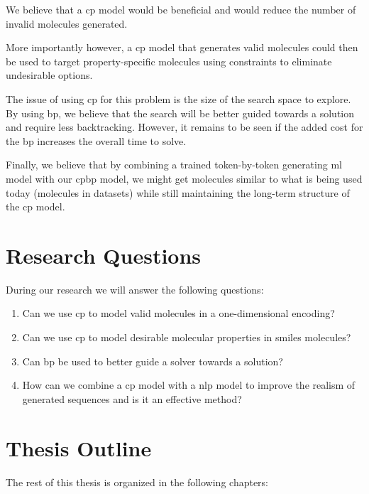 \documentclass[../Document.tex]{subfiles}
\begin{document}
We believe that a \gls{cp} model would be beneficial and would reduce the number of invalid molecules generated.

More importantly however, a \gls{cp} model that generates valid molecules could then be used to target property-specific molecules using constraints to eliminate undesirable options.

The issue of using \gls{cp} for this problem is the size of the search space to explore. By using \gls{bp}, we believe that the search will be better guided towards a solution and require less backtracking. However, it remains to be seen if the added cost for the \gls{bp} increases the overall time to solve.

Finally, we believe that by combining a trained token-by-token generating \gls{ml} model with our \gls{cpbp} model, we might get molecules similar to what is being used today (molecules in datasets) while still maintaining the long-term structure of the \gls{cp} model.


\section{Research Questions}
\label{sec:intro/questions}
During our research we will answer the following questions:

\begin{enumerate}
    \item Can we use \acrshort{cp} to model valid molecules in a one-dimensional encoding?
    \item Can we use \acrshort{cp} to model desirable molecular properties in \acrshort{smiles} molecules?
    \item Can \acrlong{bp} be used to better guide a solver towards a solution?
    \item How can we combine a \acrshort{cp} model with a \acrshort{nlp} model to improve the realism of generated sequences and is it an effective method?
\end{enumerate}

\section{Thesis Outline}
\label{sec:intro/outline}
The rest of this thesis is organized in the following chapters:
\end{document}
